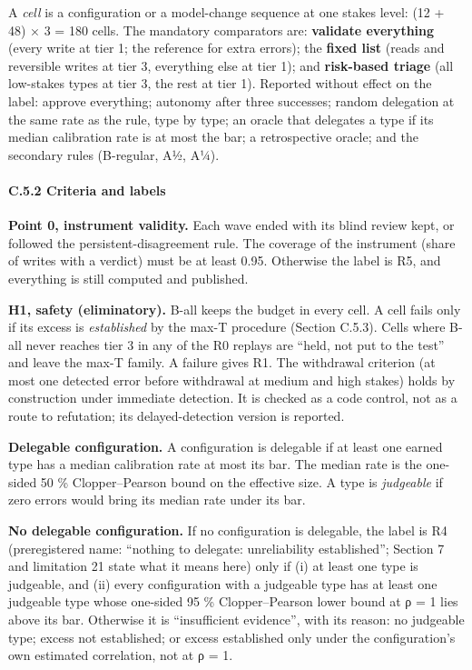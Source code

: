 A \emph{cell} is a configuration or a model-change sequence at one stakes level: (12 + 48) × 3 = 180 cells. The mandatory comparators are: \textbf{validate everything} (every write at tier 1; the reference for extra errors); the \textbf{fixed list} (reads and reversible writes at tier 3, everything else at tier 1); and \textbf{risk-based triage} (all low-stakes types at tier 3, the rest at tier 1). Reported without effect on the label: approve everything; autonomy after three successes; random delegation at the same rate as the rule, type by type; an oracle that delegates a type if its median calibration rate is at most the bar; a retrospective oracle; and the secondary rules (B-regular, A½, A¼).

\paragraph{C.5.2 Criteria and labels}\label{c.5.2-criteria-and-labels}

\textbf{Point 0, instrument validity.} Each wave ended with its blind review kept, or followed the persistent-disagreement rule. The coverage of the instrument (share of writes with a verdict) must be at least 0.95. Otherwise the label is R5, and everything is still computed and published.

\textbf{H1, safety (eliminatory).} B-all keeps the budget in every cell. A cell fails only if its excess is \emph{established} by the max-T procedure (Section C.5.3). Cells where B-all never reaches tier 3 in any of the R0 replays are ``held, not put to the test'' and leave the max-T family. A failure gives R1. The withdrawal criterion (at most one detected error before withdrawal at medium and high stakes) holds by construction under immediate detection. It is checked as a code control, not as a route to refutation; its delayed-detection version is reported.

\textbf{Delegable configuration.} A configuration is delegable if at least one earned type has a median calibration rate at most its bar. The median rate is the one-sided 50 \% Clopper--Pearson bound on the effective size. A type is \emph{judgeable} if zero errors would bring its median rate under its bar.

\textbf{No delegable configuration.} If no configuration is delegable, the label is R4 (preregistered name: ``nothing to delegate: unreliability established''; Section 7 and limitation 21 state what it means here) only if (i) at least one type is judgeable, and (ii) every configuration with a judgeable type has at least one judgeable type whose one-sided 95 \% Clopper--Pearson lower bound at ρ = 1 lies above its bar. Otherwise it is ``insufficient evidence'', with its reason: no judgeable type; excess not established; or excess established only under the configuration's own estimated correlation, not at ρ = 1.

